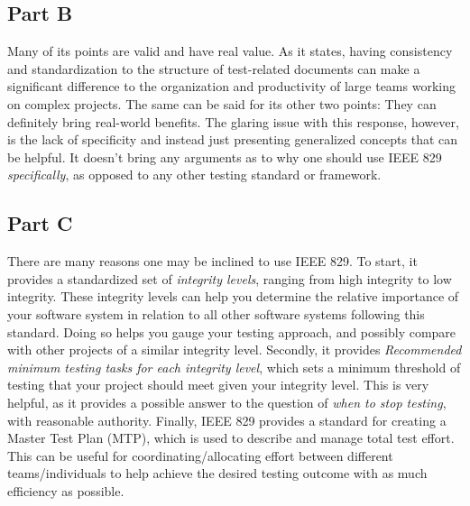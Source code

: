 \documentclass{article}
\begin{document}
\subsection{Part B}
Many of its points are valid and have real value. As it states, having consistency and standardization to the structure of test-related documents can make a significant difference
to the organization and productivity of large teams working on complex projects. The same can be said for its other two points: They can definitely bring real-world benefits. The
glaring issue with this response, however, is the lack of specificity and instead just presenting generalized concepts that can be helpful. It doesn't bring any arguments as to why
one should use IEEE 829 \textit{specifically}, as opposed to any other testing standard or framework.
\subsection{Part C}
There are many reasons one may be inclined to use IEEE 829. To start, it provides a standardized set of \textit{integrity levels}, ranging from high integrity to low integrity. These integrity levels can help
you determine the relative importance of your software system in relation to all other software systems following this standard. Doing so helps you gauge your testing approach, and possibly compare with other
projects of a similar integrity level. Secondly, it provides \textit{Recommended minimum testing tasks for each integrity level}, which sets a minimum threshold of testing that your project should meet given
your integrity level. This is very helpful, as it provides a possible answer to the question of \textit{when to stop testing}, with reasonable authority. Finally, IEEE 829 provides a standard for creating a
Master Test Plan (MTP), which is used to describe and manage total test effort. This can be useful for coordinating/allocating effort between different teams/individuals to help achieve the desired testing outcome
with as much efficiency as possible.
\end{document}
